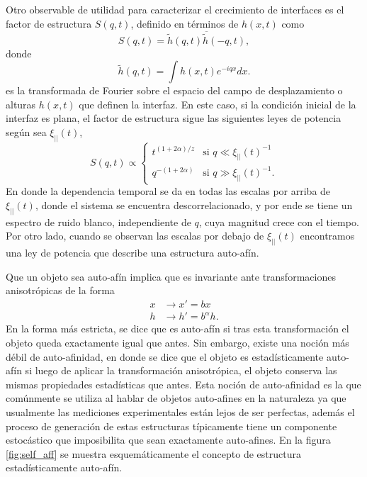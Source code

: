 
Otro observable de utilidad para caracterizar el crecimiento de interfaces es el factor de estructura $S(q,t)$, definido en términos de $h(x,t)$ como
\begin{equation}
    S(q,t) = \overline{\tilde{h}(q,t)\tilde{h}(-q,t)},
\end{equation} 
donde
\begin{equation}
    \tilde{h}(q,t) = \int h(x,t) e^{-iqx} dx.
\end{equation}
es la transformada de Fourier sobre el espacio del campo de desplazamiento o alturas $h(x,t)$ que definen la interfaz. En este caso, si la condición inicial de la interfaz es plana, el factor de estructura sigue las siguientes leyes de potencia según sea $\xi_{||}(t)$,
\begin{equation}
    S(q,t) \propto 
    \begin{cases}
        t^{(1+2\alpha)/z} & \text{si } q \ll \xi_{||}(t)^{-1} \\
        q^{-(1+2\alpha)} & \text{si } q \gg \xi_{||}(t)^{-1}.
    \end{cases}
\end{equation}
En donde la dependencia temporal se da en todas las escalas por arriba de $\xi_{||}(t)$, donde el sistema se encuentra descorrelacionado, y por ende se tiene un espectro de ruido blanco, independiente de $q$, cuya magnitud crece con el tiempo. Por otro lado, cuando se observan las escalas por debajo de $\xi_{||}(t)$ encontramos una ley de potencia que describe una estructura auto-afín.

Que un objeto sea auto-afín implica que es invariante ante transformaciones anisotrópicas de la forma 
\begin{align}
    x &\rightarrow x' = bx \\
    h &\rightarrow h' = b^{\alpha} h.
\end{align}
En la forma más estricta, se dice que es auto-afín si tras esta transformación el objeto queda exactamente igual que antes. Sin embargo, existe una noción más débil de
auto-afinidad, en donde se dice que el objeto es estadísticamente auto-afín si luego de aplicar la transformación anisotrópica, el objeto conserva 
las mismas propiedades estadísticas que antes. Esta noción de auto-afinidad es la que comúnmente se utiliza al hablar de objetos auto-afines en la naturaleza ya 
que usualmente las mediciones experimentales están lejos de ser perfectas, además el proceso de generación de estas estructuras típicamente tiene un 
componente estocástico que imposibilita que sean exactamente auto-afines. En la figura \ref{fig:self_aff} se muestra esquemáticamente el concepto de estructura 
estadísticamente auto-afín.

